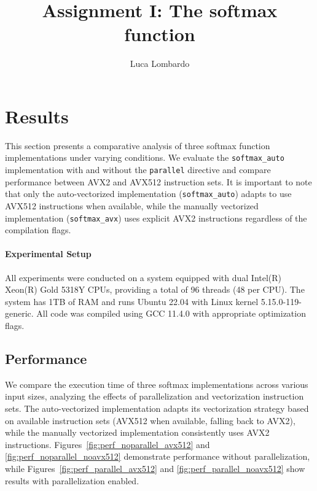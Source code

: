 \documentclass[10pt]{report}
\title{Assignment I: The softmax function}
\author{Luca Lombardo}
\begin{document}


\setlength{\parindent}{0em}
\setlength{\parskip}{-0.5em}

\section*{Results}
This section presents a comparative analysis of three softmax function implementations under varying conditions. We evaluate the \texttt{softmax\_auto} implementation with and without the \texttt{parallel} directive and compare performance between AVX2 and AVX512 instruction sets. It is important to note that only the auto-vectorized implementation (\texttt{softmax\_auto}) adapts to use AVX512 instructions when available, while the manually vectorized implementation (\texttt{softmax\_avx}) uses explicit AVX2 instructions regardless of the compilation flags.

\paragraph{Experimental Setup} All experiments were conducted on a system equipped with dual Intel(R) Xeon(R) Gold 5318Y CPUs, providing a total of 96 threads (48 per CPU). The system has 1TB of RAM and runs Ubuntu 22.04 with Linux kernel 5.15.0-119-generic. All code was compiled using GCC 11.4.0 with appropriate optimization flags.

\subsection*{Performance}

We compare the execution time of three softmax implementations across various input sizes, analyzing the effects of parallelization and vectorization instruction sets. The auto-vectorized implementation adapts its vectorization strategy based on available instruction sets (AVX512 when available, falling back to AVX2), while the manually vectorized implementation consistently uses AVX2 instructions. Figures~\ref{fig:perf_noparallel_avx512} and \ref{fig:perf_noparallel_noavx512} demonstrate performance without parallelization, while Figures~\ref{fig:perf_parallel_avx512} and \ref{fig:perf_parallel_noavx512} show results with parallelization enabled.
\end{document}
